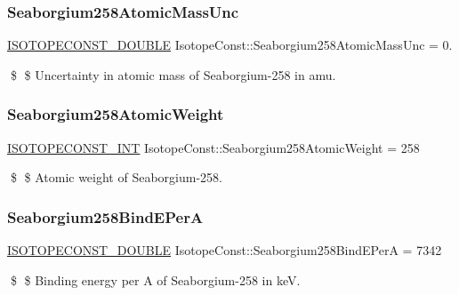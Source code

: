 \subsubsection{\texorpdfstring{Seaborgium258\+Atomic\+Mass\+Unc}{Seaborgium258AtomicMassUnc}}
{\footnotesize\ttfamily \mbox{\hyperlink{group___isotope_const-_macros_ga8f45a7272ce02c0b4c65c44636ed719a}{I\+S\+O\+T\+O\+P\+E\+C\+O\+N\+S\+T\+\_\+\+D\+O\+U\+B\+LE}} Isotope\+Const\+::\+Seaborgium258\+Atomic\+Mass\+Unc = 0.}

\$ \$ Uncertainty in atomic mass of Seaborgium-\/258 in amu. \mbox{\label{group___isotope_const-_seaborgium-_sg258_gae6ea6c8f312a15444a366aa0a2281348}} 
\subsubsection{\texorpdfstring{Seaborgium258\+Atomic\+Weight}{Seaborgium258AtomicWeight}}
{\footnotesize\ttfamily \mbox{\hyperlink{group___isotope_const-_macros_ga5f18360b3e99483a35c32d789e62621c}{I\+S\+O\+T\+O\+P\+E\+C\+O\+N\+S\+T\+\_\+\+I\+NT}} Isotope\+Const\+::\+Seaborgium258\+Atomic\+Weight = 258}

\$ \$ Atomic weight of Seaborgium-\/258. \mbox{\label{group___isotope_const-_seaborgium-_sg258_gae399d6ed4a88933adcfa6ccc3decb861}} 
\subsubsection{\texorpdfstring{Seaborgium258\+Bind\+E\+PerA}{Seaborgium258BindEPerA}}
{\footnotesize\ttfamily \mbox{\hyperlink{group___isotope_const-_macros_ga8f45a7272ce02c0b4c65c44636ed719a}{I\+S\+O\+T\+O\+P\+E\+C\+O\+N\+S\+T\+\_\+\+D\+O\+U\+B\+LE}} Isotope\+Const\+::\+Seaborgium258\+Bind\+E\+PerA = 7342}

\$ \$ Binding energy per A of Seaborgium-\/258 in keV. \mbox{\label{group___isotope_const-_seaborgium-_sg258_ga48bccd1ff05ce070159308f41b0cf0a0}} 
